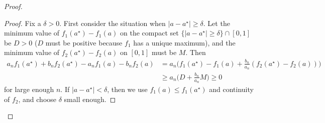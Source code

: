 \documentclass[10pt,a4paper]{amsart}
\begin{document}
\begin{proof}
\begin{proof} 
Fix a $\delta>0$. First consider the situation when $|a-a^\star|\geq \delta$. Let the minimum value of $f_1(a^\star) - f_1(a)$ on the compact set $\{|a-a^\star|\geq \delta\} \cap [0,1]$ be $D>0$ ($D$ must be positive because $f_1$ has a unique maximum), and the minimum value of $f_2(a^\star) - f_2(a)$ on $[0,1]$ must be $M$. Then
	\begin{equation}
	\begin{aligned}
 	a_nf_1(a^\star)+b_nf_2(a^\star) - a_nf_1(a)-b_nf_2(a) 
 	&= a_n\Big(f_1(a^\star) - f_1(a) + \frac{b_n}{a_n}(f_2(a^\star) - f_2(a))\Big)\\
 	&\geq a_n\Big(D + \frac{b_n}{a_n}M\Big) \geq 0
	\end{aligned}
	\end{equation}
for large enough $n$. If $|a-a^\star|< \delta$, then we use $f_1(a) \leq f_1(a^\star)$ and continuity of $f_2$, and choose $\delta$ small enough. 
\end{proof}


\end{proof}
\end{document}
